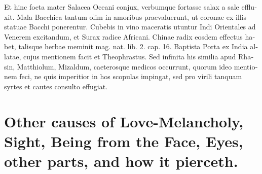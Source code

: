 \begin{latin}
Et hinc foeta mater Salacea Oceani conjux, verbumque fortasse salax a
sale effluxit. Mala Bacchica tantum olim in amoribus praevaluerunt, ut
coronae ex illis statuae Bacchi ponerentur. Cubebis in vino
maceratis utuntur Indi Orientales ad Venerem excitandum, et Surax
radice Africani. Chinae radix eosdem effectus habet, talisque herbae
meminit mag. nat. lib. 2. cap. 16. Baptista Porta ex India
allatae, cujus mentionem facit et Theophrastus. Sed infinita his
similia apud Rhasin, Matthiolum, Mizaldum, caeterosque medicos
occurrunt, quorum ideo mentionem feci, ne quis imperitior in hos
scopulas impingat, sed pro virili tanquam syrtes et cautes consulto
effugiat.
\end{latin}

\section[Other causes of Love-Melancholy]{Other causes of Love-Melancholy, Sight, Being from the Face, Eyes, other parts, and how it pierceth.}

